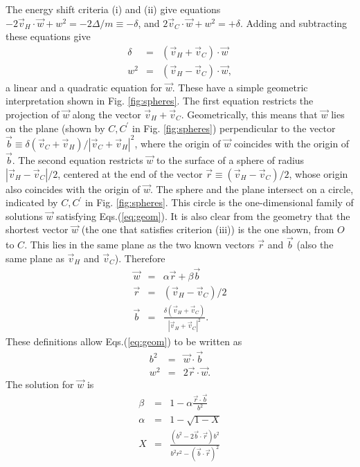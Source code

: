 \documentclass[aps,prb,twocolumn,showpacs,superscriptaddress]{revtex4-1}\begin{tiny}\end{tiny}
\begin{document}
The energy shift criteria (i) and (ii) give equations 
$-2\vec{v}_H \cdot\vec{w} +w^2=-2\Delta/m\equiv-\delta$,
and $2\vec{v}_C \cdot\vec{w} +w^2=+\delta$.  Adding and subtracting these equations
give
%
\begin{eqnarray}
\delta&=&(\vec{v}_H + \vec{v}_C)\cdot \vec{w} \nonumber  \\
w^2 &=& (\vec{v}_H-\vec{v}_C)\cdot \vec{w},
\label{eq:geom}
\end{eqnarray}
%
a linear and a quadratic equation for $\vec{w}$.  These have a simple geometric interpretation
shown in Fig. \ref{fig:spheres}.  The first equation restricts the projection of $\vec{w}$ along 
the vector $\vec{v}_H + \vec{v}_C$.  Geometrically, this means that $\vec{w}$ lies on the plane
(shown by $C,C^\prime$ in Fig. \ref{fig:spheres})
perpendicular to the vector $\vec{b}\equiv \delta (\vec{v}_C + \vec{v}_H)/|\vec{v}_C+\vec{v}_H|^2$,
where the origin of $\vec{w}$ coincides with the origin of $\vec{b}$.
The second equation restricts $\vec{w}$ to the surface of a sphere of radius $|\vec{v}_H-\vec{v}_C|/2$,
centered at the end of the vector $\vec{r}\equiv(\vec{v}_H-\vec{v}_C)/2$, whose origin also coincides
with the origin of $\vec{w}$.  The sphere and the plane intersect on a circle, indicated by $C,C^\prime$
in Fig. \ref{fig:spheres}.   This circle is the one-dimensional family of solutions $\vec{w}$
satisfying Eqs.(\ref{eq:geom}).  It is also clear from the geometry that the shortest vector
$\vec{w}$ (the one that satisfies criterion (iii))
 is the one shown, from $O$ to $C$.  This lies in the same plane as the two known
vectors $\vec{r}$ and $\vec{b}$ (also the same plane as $\vec{v}_H$ and $\vec{v}_C$).  Therefore 
%
\begin{eqnarray}
\vec{w}&=&\alpha\vec{r} + \beta\vec{b} \nonumber \\ 
\vec{r}&=& (\vec{v}_H-\vec{v}_C)/2  \nonumber \\
\vec{b} &=& \frac{\delta(\vec{v}_H + \vec{v}_C)}{|\vec{v}_H+ \vec{v}_C|^2}.
\label{eq:defs}
\end{eqnarray}
%
These definitions allow Eqs.(\ref{eq:geom}) to be written as
%
\begin{eqnarray}
b^2&=&\vec{w}\cdot\vec{b} \nonumber  \\
w^2 &=& 2\vec{r}\cdot \vec{w}.
\label{eq:geom1}
\end{eqnarray}
%
The solution for $\vec{w}$ is
%
\begin{eqnarray}
\beta &=& 1-\alpha \frac{\vec{r}\cdot\vec{b}}{b^2} \nonumber \\
\alpha &=& 1-\sqrt{1-X}  \nonumber \\
X &=& \frac{(b^2-2\vec{b}\cdot\vec{r})b^2}{b^2 r^2 - (\vec{b}\cdot\vec{r})^2}
\label{eq:soln}
\end{eqnarray}
\end{document}
